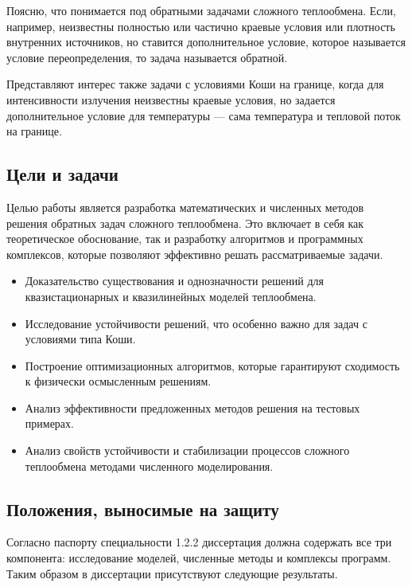 \documentclass[8pt,a4paper]{article}
\begin{document}
    Поясню, что понимается под обратными задачами сложного теплообмена.
    Если, например, неизвестны полностью или частично краевые условия или плотность внутренних источников,
    но ставится дополнительное условие, которое называется условие переопределения,
    то задача называется обратной.

    Представляют интерес также задачи с условиями Коши на границе, когда для интенсивности
    излучения неизвестны краевые условия, но задается дополнительное условие для температуры ---
    сама температура и тепловой поток на границе.

    \subsection*{Цели и задачи}
    Целью работы является разработка математических
    и численных методов решения обратных задач сложного теплообмена.
    Это включает в себя как теоретическое обоснование,
    так и разработку алгоритмов и программных комплексов,
    которые позволяют эффективно решать рассматриваемые задачи.
    \begin{itemize}
        \item Доказательство существования и однозначности решений для квазистационарных и квазилинейных моделей теплообмена.
        \item Исследование устойчивости решений, что особенно важно для задач с условиями типа Коши.
        \item Построение оптимизационных алгоритмов, которые гарантируют сходимость к физически осмысленным решениям.
        \item Анализ эффективности предложенных методов решения на тестовых примерах.
        \item Анализ свойств устойчивости и стабилизации процессов сложного теплообмена методами численного моделирования.
    \end{itemize}

    \subsection*{Положения, выносимые на защиту}
    Согласно паспорту специальности 1.2.2 диссертация должна содержать все три компонента:
    исследование моделей, численные методы и комплексы программ.
    Таким образом в диссертации присутствуют следующие результаты.
\end{document}
